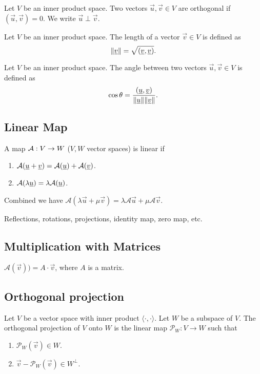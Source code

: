 \begin{definition}[Orthogonal]
    Let $V$ be an inner product space. Two vectors $\vec{u}, \vec{v} \in V$ are orthogonal if $(\vec{u}, \vec{v}) = 0$.
    We write $\vec{u} \perp \vec{v}$.
\end{definition}

\begin{definition}[Length]
    Let $V$ be an inner product space. The length of a vector $\vec{v} \in V$ is defined as
    $$\norm{\underline{v}} = \sqrt{(\underline{v}, \underline{v})}.$$
\end{definition}

\begin{definition}
    Let $V$ be an inner product space. The angle between two vectors $\vec{u}, \vec{v} \in V$ is defined as
    $$\cos \theta = \frac{(\underline{u}, \underline{v})}{\norm{\underline{u}}\norm{\underline{v}}}.$$
\end{definition}

\subsection{Linear Map}
\begin{definition}
    A map $\mathcal{A}: V \to W$ ($V, W$ vector spaces) is linear if
    \begin{enumerate}
        \item $\mathcal{A}(\underline{u} + \underline{v}) = \mathcal{A}(\underline{u}) + \mathcal{A}(\underline{v})$.
        \item $\mathcal{A}(\lambda\underline{u}) = \lambda \mathcal{A}(\underline{u})$.
    \end{enumerate}
    Combined we have $\mathcal{A}(\lambda \vec{u} + \mu \vec{v}) = \lambda\mathcal{A}\vec{u} + \mu\mathcal{A}\vec{v}$.
\end{definition}

\begin{example}
Reflections, rotations, projections, identity map, zero map, etc.
\end{example}

\subsection{Multiplication with Matrices}
$ \mathcal{A}(\vec{v})) = A \cdot \vec{v} $, where $A$ is a matrix.

\subsection{Orthogonal projection}
\begin{definition}
    Let $V$ be a vector space with inner product $\langle \cdot, \cdot \rangle$. Let $W$ be a subspace of $V$. The orthogonal projection of $V$ onto $W$ is the linear map $\mathcal{P}_W: V \to W$ such that
    \begin{enumerate}
        \item $\mathcal{P}_W(\vec{v}) \in W$.
        \item $\vec{v} - \mathcal{P}_W(\vec{v}) \in W^\perp$.
    \end{enumerate}
\end{definition}

